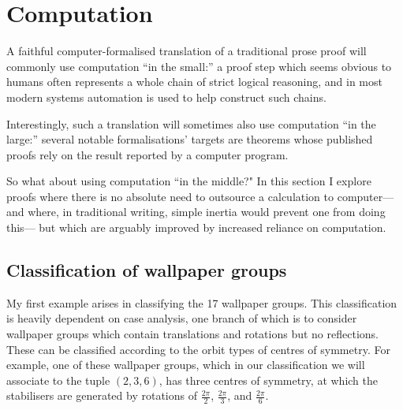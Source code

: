 \documentclass[runningheads]{llncs}
\begin{document}
\section{Computation} \label{sec:computation}

A faithful computer-formalised translation of a traditional prose proof will commonly use computation
``in the small:''
a proof step which seems obvious to humans
often represents a whole chain of strict logical reasoning,
and in most modern systems automation is used to help construct such chains.

Interestingly, such a translation will sometimes also use computation ``in the large:''
several notable formalisations' \cite{Gon08Notices,Hal17,Imm2018}
targets are
theorems whose published proofs rely on the result reported by a computer program.

So what about using computation ``in the middle?"
In this section I explore proofs where there is no absolute need to outsource a calculation to computer---%
and where, in traditional writing, simple inertia would prevent one from doing this---%
but which are arguably improved by increased reliance on computation.


\subsection{Classification of wallpaper groups} \label{sec:wallpaper}

My first example 
arises in classifying the 17 wallpaper groups.
This classification is heavily dependent on case analysis,
one branch of which is to consider wallpaper groups which contain translations and
rotations but no reflections.
These can be classified according to the orbit types of centres of symmetry.
For example, one of these wallpaper groups,
which in our classification we will associate to the tuple $(2,3,6)$,
has three centres of symmetry,
at which the stabilisers are generated by rotations of
$\frac{2\pi}{2}$,
$\frac{2\pi}{3}$,
and $\frac{2\pi}{6}$.
\end{document}
